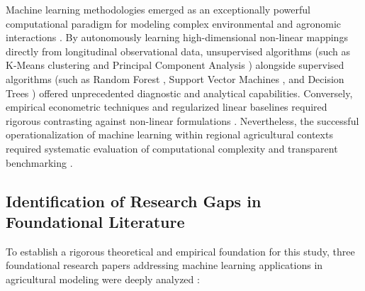 \documentclass[conference]{IEEEtran}
\begin{document}
Machine learning methodologies emerged as an exceptionally powerful computational paradigm for modeling complex environmental and agronomic interactions \cite{dhakal2023}. By autonomously learning high-dimensional non-linear mappings directly from longitudinal observational data, unsupervised algorithms (such as K-Means clustering \cite{macqueen1967} and Principal Component Analysis \cite{hotelling1933}) alongside supervised algorithms (such as Random Forest \cite{breiman2001}, Support Vector Machines \cite{cortes1995}, and Decision Trees \cite{quinlan1986}) offered unprecedented diagnostic and analytical capabilities. Conversely, empirical econometric techniques and regularized linear baselines required rigorous contrasting against non-linear formulations \cite{hastie2009, hoerl1970}. Nevertheless, the successful operationalization of machine learning within regional agricultural contexts required systematic evaluation of computational complexity and transparent benchmarking \cite{hastie2009}.

\subsection{Identification of Research Gaps in Foundational Literature}
To establish a rigorous theoretical and empirical foundation for this study, three foundational research papers addressing machine learning applications in agricultural modeling were deeply analyzed \cite{dhakal2023, crane2018, fernandez2021}:
\end{document}

